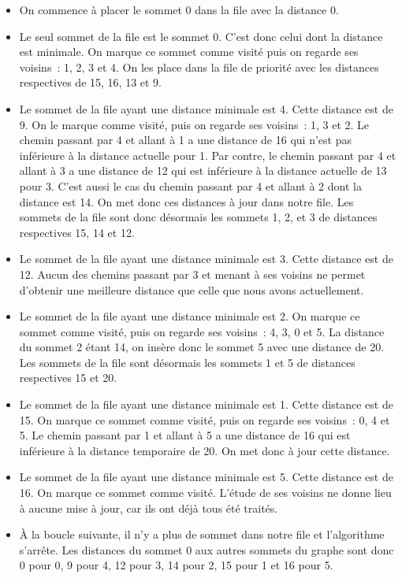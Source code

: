 \documentclass{magnolia}
\begin{document}
\begin{itemize}
\item On commence à placer le sommet 0 dans la file avec la distance 0.
\item Le seul sommet de la file est le sommet 0. C'est donc celui dont
  la distance est minimale. On marque ce sommet comme visité puis on
  regarde ses voisins~: 1, 2, 3 et 4. On les place dans la file de priorité
  avec les distances respectives de 15, 16, 13 et 9.
\item Le sommet de la file ayant une distance minimale est 4. Cette distance est de 9.
  On le marque comme visité, puis on regarde ses voisins~: 1, 3 et 2.
  Le chemin passant par 4 et allant à 1 a une distance de 16 qui n'est pas inférieure
  à la distance actuelle pour 1. Par contre, le chemin passant par 4 et allant à 3
  a une distance de 12 qui est inférieure à la distance actuelle de 13 pour 3. C'est aussi le
  cas du chemin passant par 4 et allant à 2 dont la distance est 14. On met donc
  ces distances à jour dans notre file. Les sommets de la file sont donc désormais
  les sommets 1, 2, et 3 de distances respectives 15, 14 et 12.
\item Le sommet de la file ayant une distance minimale est 3. Cette distance est de 12.
  Aucun des chemins passant par 3 et menant à ses voisins ne permet d'obtenir une
  meilleure distance que celle que nous avons actuellement.
\item Le sommet de la file ayant une distance minimale est 2. 
  On marque ce sommet comme visité, puis on regarde ses voisins~: 4, 3, 0 et 5. La
  distance du sommet 2 étant 14, on insère donc le sommet 5 avec une distance de 20.
  Les sommets de la file sont désormais les sommets 1 et 5 de distances respectives 15 et 20.
\item Le sommet de la file ayant une distance minimale est 1. Cette distance est de 15.
  On marque ce sommet comme visité, puis on regarde ses voisins~: 0, 4 et 5.
  Le chemin passant par 1 et allant à 5 a une distance de 16 qui est inférieure
  à la distance temporaire de 20. On met donc à jour cette distance.
\item Le sommet de la file ayant une distance minimale est 5. Cette distance est de 16.
  On marque ce sommet comme visité. L'étude de ses voisins ne donne lieu à aucune mise à
  jour, car ils ont déjà tous été traités.
\item À la boucle suivante, il n'y a plus de sommet dans notre file et l'algorithme
  s'arrête. Les distances du sommet 0 aux autres sommets du graphe sont donc 0 pour 0,
  9 pour 4, 12 pour 3, 14 pour 2, 15 pour 1 et 16 pour 5.
\end{itemize}
\vspace{2ex}
\end{document}
